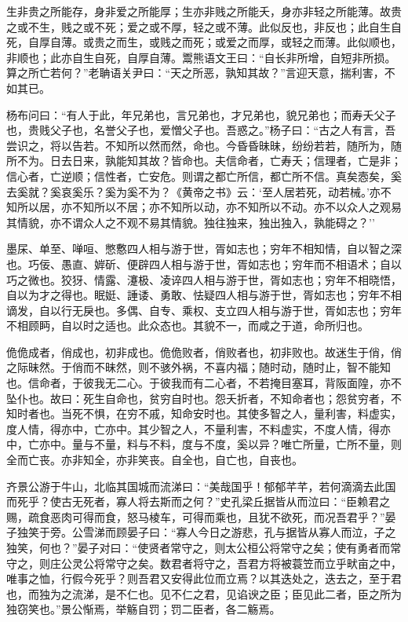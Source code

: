 \documentclass[]{article}
\begin{document}
生非贵之所能存，身非爱之所能厚；生亦非贱之所能夭，身亦非轻之所能薄。故贵之或不生，贱之或不死；爱之或不厚，轻之或不薄。此似反也，非反也；此自生自死，自厚自薄。或贵之而生，或贱之而死；或爱之而厚，或轻之而薄。此似顺也，非顺也；此亦自生自死，自厚自薄。鬻熊语文王曰：``自长非所增，自短非所损。算之所亡若何？''老聃语关尹曰：``天之所恶，孰知其故？''言迎天意，揣利害，不如其已。

杨布问曰：``有人于此，年兄弟也，言兄弟也，才兄弟也，貌兄弟也；而寿夭父子也，贵贱父子也，名誉父子也，爱憎父子也。吾惑之。''杨子曰：``古之人有言，吾尝识之，将以告若。不知所以然而然，命也。今昏昏昧昧，纷纷若若，随所为，随所不为。日去日来，孰能知其故？皆命也。夫信命者，亡寿夭；信理者，亡是非；信心者，亡逆顺；信性者，亡安危。则谓之都亡所信，都亡所不信。真矣悫矣，奚去奚就？奚哀奚乐？奚为奚不为？《黄帝之书》云：`至人居若死，动若械。'亦不知所以居，亦不知所以不居；亦不知所以动，亦不知所以不动。亦不以众人之观易其情貌，亦不谓众人之不观不易其情貌。独往独来，独出独入，孰能碍之？''

墨杘、单至、啴咺、憋懯四人相与游于世，胥如志也；穷年不相知情，自以智之深也。巧佞、愚直、婩斫、便辟四人相与游于世，胥如志也；穷年而不相语术；自以巧之微也。狡犽、情露、瀽极、凌谇四人相与游于世，胥如志也；穷年不相晓悟，自以为才之得也。眠娗、諈诿、勇敢、怯疑四人相与游于世，胥如志也；穷年不相谪发，自以行无戾也。多偶、自专、乘权、支立四人相与游于世，胥如志也；穷年不相顾眄，自以时之适也。此众态也。其貌不一，而咸之于道，命所归也。

佹佹成者，俏成也，初非成也。佹佹败者，俏败者也，初非败也。故迷生于俏，俏之际昧然。于俏而不昧然，则不骇外祸，不喜内福；随时动，随时止，智不能知也。信命者，于彼我无二心。于彼我而有二心者，不若掩目塞耳，背阪面隍，亦不坠仆也。故曰：死生自命也，贫穷自时也。怨夭折者，不知命者也；怨贫穷者，不知时者也。当死不惧，在穷不戚，知命安时也。其使多智之人，量利害，料虚实，度人情，得亦中，亡亦中。其少智之人，不量利害，不料虚实，不度人情，得亦中，亡亦中。量与不量，料与不料，度与不度，奚以异？唯亡所量，亡所不量，则全而亡丧。亦非知全，亦非笑丧。自全也，自亡也，自丧也。

齐景公游于牛山，北临其国城而流涕曰：``美哉国乎！郁郁芊芊，若何滴滴去此国而死乎？使古无死者，寡人将去斯而之何？''史孔梁丘据皆从而泣曰：``臣赖君之赐，疏食恶肉可得而食，怒马棱车，可得而乘也，且犹不欲死，而况吾君乎？''晏子独笑于旁。公雪涕而顾晏子曰：``寡人今日之游悲，孔与据皆从寡人而泣，子之独笑，何也？''晏子对曰：``使贤者常守之，则太公桓公将常守之矣；使有勇者而常守之，则庄公灵公将常守之矣。数君者将守之，吾君方将被蓑笠而立乎畎亩之中，唯事之恤，行假今死乎？则吾君又安得此位而立焉？以其迭处之，迭去之，至于君也，而独为之流涕，是不仁也。见不仁之君，见谄谀之臣；臣见此二者，臣之所为独窃笑也。''景公惭焉，举觞自罚；罚二臣者，各二觞焉。
\end{document}
